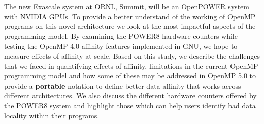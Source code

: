 The new Exascale system at ORNL, Summit, will be an OpenPOWER system with NVIDIA GPUs. To provide a better understand of the working of OpenMP 
programs on this novel architecture we look at the most impactful aspects of the programming model. By examining the POWER8 hardware counters while testing the OpenMP 4.0 affinity features implemented in GNU, we hope to measure effects of affinity at scale. Based on this study, we describe the challenges that we faced in quantifying effects of affinity, limitations in the current OpenMP programming model and how some of these may be addressed in OpenMP 5.0 to provide a \textbf{portable} notation to define better data affinity that works across different architectures. We also discuss the different hardware counters offered by the POWER8 system and highlight those which can help users identify bad data locality within their programs.

